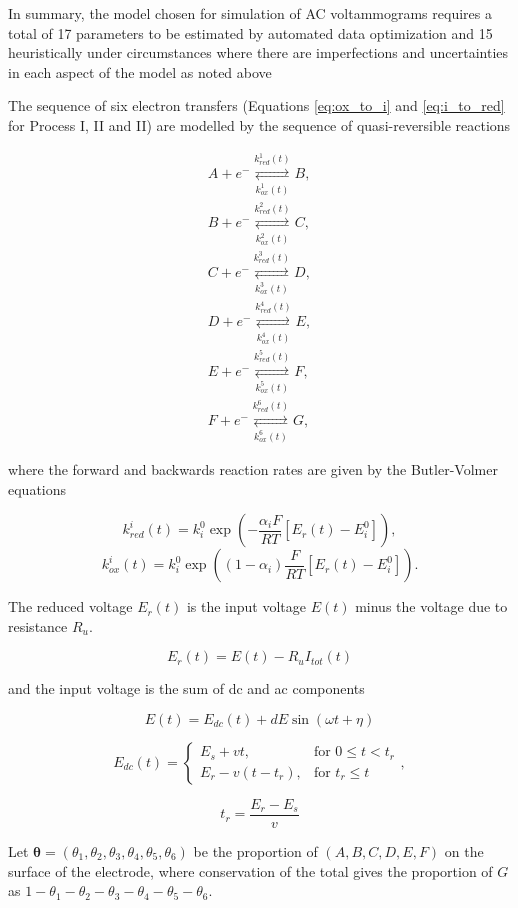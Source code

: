 \documentclass[a4paper, 12pt]{article}
\begin{document}
In summary, the model chosen for simulation of AC voltammograms requires a total 
of 17 parameters to be estimated by automated data optimization and 15 
heuristically under circumstances where there are imperfections and 
uncertainties in each aspect of the model as noted above 

The sequence of six electron transfers (Equations \ref{eq:ox_to_i} and 
\ref{eq:i_to_red} for Process I, II and II) are modelled by the sequence of 
quasi-reversible reactions

\begin{align} \label{eq:all_reaction}
    A + e^- \underset{k^1_{ox}(t)}{\overset{k^1_{red}(t)}{\rightleftarrows}} B, 
    \\
    B + e^- \underset{k^2_{ox}(t)}{\overset{k^2_{red}(t)}{\rightleftarrows}} C, 
    \\
    C + e^- \underset{k^3_{ox}(t)}{\overset{k^3_{red}(t)}{\rightleftarrows}} D, 
    \\
    D + e^- \underset{k^4_{ox}(t)}{\overset{k^4_{red}(t)}{\rightleftarrows}} E, 
    \\
    E + e^- \underset{k^5_{ox}(t)}{\overset{k^5_{red}(t)}{\rightleftarrows}} F, 
    \\
    F + e^-  \underset{k^6_{ox}(t)}{\overset{k^6_{red}(t)}{\rightleftarrows}} G,
\end{align}

where the forward and backwards reaction rates are given by the Butler-Volmer 
equations

$$ \label{eq:rate1}
k^i_{red}(t) = k^0_i \exp\left(-\frac{\alpha_i F}{RT} [E_r(t) - E^0_i] \right),
$$
$$ \label{eq:rate2}
k^i_{ox}(t) = k^0_i \exp\left((1-\alpha_i)\frac{F}{RT} [E_r(t) - E^0_i] \right).
$$

The reduced voltage $E_r(t)$ is the input voltage $E(t)$ minus the voltage due 
to resistance $R_u$.

$$
E_r(t) = E(t) - R_u I_{tot}(t)
$$

and the input voltage is the sum of dc and ac components

$$
E(t) = E_{dc}(t) + dE\sin(\omega t + \eta)
$$

$$
E_{dc}(t) = \left. \begin{cases} E_{s} + vt, & \text{for } 0 \le t < t_r\\
E_{r} - v(t-t_r), & \text{for } t_r \le t
\end{cases} \right. ,
$$

$$
t_r = \frac{E_{r}-E_{s}}{v}
$$

Let $\bm{\theta} = (\theta_1,\theta_2,\theta_3,\theta_4,\theta_5,\theta_6)$ be 
the proportion of $(A,B,C,D,E,F)$ on the surface of the electrode, where 
conservation of the total gives the proportion of $G$ as 
$1-\theta_1-\theta_2-\theta_3-\theta_4-\theta_5-\theta_6$. 
\end{document}
